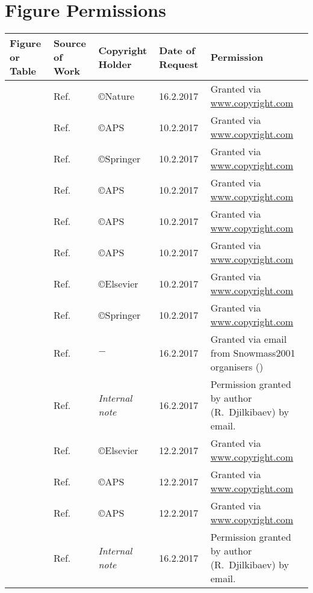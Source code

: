 \chapter{Figure Permissions}
\begin{tabular}{L{0.1\textwidth}L{0.1\textwidth}L{0.12\textwidth}L{0.12\textwidth}L{0.45\textwidth}}
\hline
Figure or Table & Source of Work & Copyright Holder & Date of Request & Permission \\ 
\hline
{} & Ref.~\cite{Williams1940102}   & \copyright Nature   & 16.2.2017 & Granted via \url{www.copyright.com}\\
      & Ref.~\cite{Hincks194802}      & \copyright APS      & 10.2.2017 & Granted via \url{www.copyright.com}\\
            & Ref.~\cite{Hartmann:1982uk}   & \copyright Springer & 10.2.2017 & Granted via \url{www.copyright.com}\\
                & Ref.~\cite{Czarnecki2011}     & \copyright APS      & 10.2.2017 & Granted via \url{www.copyright.com}\\
        & Ref.~\cite{Krane:1979wt}      & \copyright APS      & 10.2.2017 & Granted via \url{www.copyright.com}\\
     & Ref.~\cite{Sobottka1968}      & \copyright APS      & 10.2.2017 & Granted via \url{www.copyright.com}\\
   & Ref.~\cite{Wyttenbach:1978rp} & \copyright Elsevier & 10.2.2017 & Granted via \url{www.copyright.com}\\
            & Ref.~\cite{sindrum2006}       & \copyright Springer & 10.2.2017 & Granted via \url{www.copyright.com}\\
                    & Ref.~\cite{MECO}              &  $-$     & 16.2.2017 & Granted via email from Snowmass2001 organisers () \\
        & Ref.~\cite{Meco023}           &  \emph{Internal note}     & 16.2.2017 &Permission granted by author (R.\ Djilkibaev) by email. \\
          & Ref.~\cite{T2K:nim}           & \copyright Elsevier & 12.2.2017 & Granted via \url{www.copyright.com}\\
      & Ref.~\cite{RevModPhys.76.31}  & \copyright APS      & 12.2.2017 & Granted via \url{www.copyright.com}\\
             & Ref.~\cite{Bistirlich:1972jy} & \copyright APS      & 12.2.2017 & Granted via \url{www.copyright.com}\\
   & Ref.~\cite{Meco024}           &  \emph{Internal note}     & 16.2.2017 & Permission granted by author (R.\ Djilkibaev) by email.\\
\hline
\end{tabular}

